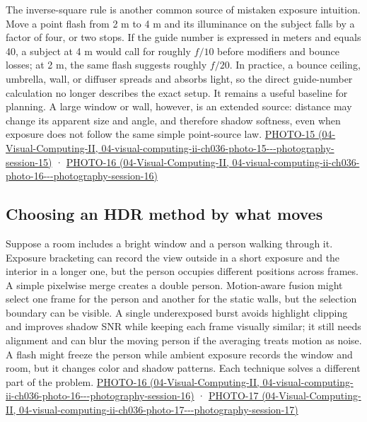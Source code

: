 The inverse-square rule is another common source of mistaken exposure intuition. Move a point flash from 2 m to 4 m and its illuminance on the subject falls by a factor of four, or two stops. If the guide number is expressed in meters and equals 40, a subject at 4 m would call for roughly \(f/10\) before modifiers and bounce losses; at 2 m, the same flash suggests roughly \(f/20\). In practice, a bounce ceiling, umbrella, wall, or diffuser spreads and absorbs light, so the direct guide-number calculation no longer describes the exact setup. It remains a useful baseline for planning. A large window or wall, however, is an extended source: distance may change its apparent size and angle, and therefore shadow softness, even when exposure does not follow the same simple point-source law. \href{../04-Visual-Computing-II/main.pdf\#nameddest=04-visual-computing-ii-ch036-photo-15---photography-session-15}{PHOTO-15 (04-Visual-Computing-II, 04-visual-computing-ii-ch036-photo-15-\/-\/-photography-session-15)} · \href{../04-Visual-Computing-II/main.pdf\#nameddest=04-visual-computing-ii-ch036-photo-16---photography-session-16}{PHOTO-16 (04-Visual-Computing-II, 04-visual-computing-ii-ch036-photo-16-\/-\/-photography-session-16)}

\subsection{Choosing an HDR method by what moves}\label{03-visual-computing-i-ch003-choosing-an-hdr-method-by-what-moves}

Suppose a room includes a bright window and a person walking through it. Exposure bracketing can record the view outside in a short exposure and the interior in a longer one, but the person occupies different positions across frames. A simple pixelwise merge creates a double person. Motion-aware fusion might select one frame for the person and another for the static walls, but the selection boundary can be visible. A single underexposed burst avoids highlight clipping and improves shadow SNR while keeping each frame visually similar; it still needs alignment and can blur the moving person if the averaging treats motion as noise. A flash might freeze the person while ambient exposure records the window and room, but it changes color and shadow patterns. Each technique solves a different part of the problem. \href{../04-Visual-Computing-II/main.pdf\#nameddest=04-visual-computing-ii-ch036-photo-16---photography-session-16}{PHOTO-16 (04-Visual-Computing-II, 04-visual-computing-ii-ch036-photo-16-\/-\/-photography-session-16)} · \href{../04-Visual-Computing-II/main.pdf\#nameddest=04-visual-computing-ii-ch036-photo-17---photography-session-17}{PHOTO-17 (04-Visual-Computing-II, 04-visual-computing-ii-ch036-photo-17-\/-\/-photography-session-17)}


